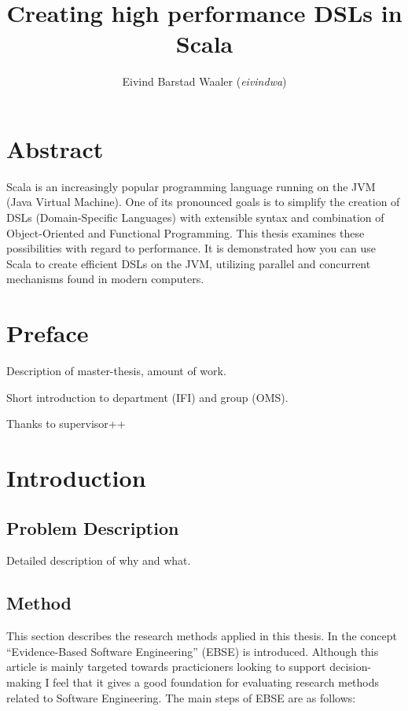 \documentclass[a4paper,english]{report}
\title{Creating high performance DSLs in Scala}
\author{Eivind Barstad Waaler (\emph{eivindwa})}
\begin{document}
\uiosloforside[kind={Master thesis},boxcolor=matnat,textcolor=white]

\chapter*{Abstract}

Scala is an increasingly popular programming language running on the
JVM (Java Virtual Machine). One of its pronounced goals is to simplify
the creation of DSLs (Domain-Specific Languages) with extensible
syntax and combination of Object-Oriented and Functional
Programming. This thesis examines these possibilities with regard to
performance. It is demonstrated how you can use Scala to create
efficient DSLs on the JVM, utilizing parallel and concurrent
mechanisms found in modern computers.

\tableofcontents

\listoftables

\listoffigures

\chapter*{Preface}

Description of master-thesis, amount of work.

Short introduction to department (IFI) and group (OMS).

Thanks to supervisor++

\chapter{Introduction}

\section{Problem Description}

Detailed description of why and what. 

\section{Method}

This section describes the research methods applied in this
thesis. In\cite{dyb08} the concept ``Evidence-Based Software
Engineering'' (EBSE) is introduced. Although this article is mainly
targeted towards practicioners looking to support decision-making I
feel that it gives a good foundation for evaluating research methods
related to Software Engineering. The main steps of EBSE are as
follows:
\end{document}
